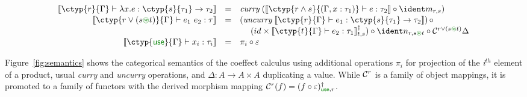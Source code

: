 \begin{figure*}[t]
\vspace{-1em}
\newcommand{\uu}[1]{\overline{#1}}
\begin{equation*}
\begin{array}{rcll}
\sem{\ctyp{r}{\Gamma} \vdash \lambda x.e : \ctyp{s}{\tau_1} \rightarrow \tau_2} &=& 
    \emph{curry} \; (\sem{\ctyp{r \wedge s}{(\Gamma, x:\tau_1)} \vdash e : \tau_2} \circ \cmerge_{r, s})    %
\\[0.1em]
\sem{\ctyp{r \vee (s \cseq t)}{\Gamma} \vdash e_1~e_2 : \tau} &=& 
    (\emph{uncurry} \;  \sem{\ctyp{r}{\Gamma} \vdash e_1 : \ctyp{s}{\tau_1} \rightarrow \tau_2}) \, \circ \\
 & & \quad\; (id \times \cobind{\sem{\ctyp{t}{\Gamma}\vdash e_2 : \tau_1}}{t,s})
    \circ \csplit_{r, s \cseq t} \circ \ccat^{r \vee (s \cseq t)}\Delta
\\[0.1em]
\sem{\ctyp{\cunit}{\Gamma} \vdash x_i : \tau_i} &=&
    \pi_i \circ \counit                                                                  %
\end{array}
\end{equation*}
\vspace{-1.5em}
\caption{Categorical semantics for the coeffect calculus}
\label{fig:semantics}
\vspace{-1.0em}
\end{figure*}

Figure~\ref{fig:semantics} shows the
categorical semantics of the coeffect calculus
using additional operations 
$\pi_i$ for projection of the \emph{i}$^{th}$ element of a 
product, usual
\emph{curry} and \emph{uncurry} operations, and
 $\Delta : A \rightarrow A \times A$ duplicating a
value. While $\mathcal{C}^{r}$ is a family of object mappings,
it is promoted to a family of functors with the derived morphism mapping 
$\ccat^{r}(f) = \cobind{ (f \circ \counit) }{\cunit, r}$.

